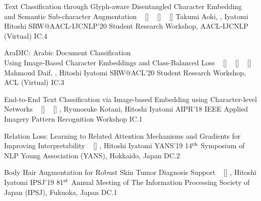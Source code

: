 \begin{publications}
    \publication
        {Text Classification through Glyph-aware Disentangled Character Embedding \\ and Semantic Sub-character Augmentation}
        {
            ~ [\href{https://aclanthology.org/2020.aacl-srw.1/}{\small{\linkSymbol}}]
            ~ [\href{https://arxiv.org/abs/2011.04184}{\small{\arxivSymbol}}]
            ~ [\href{https://github.com/IyatomiLab/GDCE-SSA}{\small{\githubSymbol}}]
        }
        {Takumi Aoki, \underline{}, Iyatomi Hitoshi}
        {SRW@AACL-IJCNLP'20} {Student Research Workshop, AACL-IJCNLP (Virtual)} {IC.4}

    \publication
        {AraDIC: Arabic Document Classification \\ Using Image-Based Character Embeddings and Class-Balanced Loss}
        {
            ~ [\href{https://aclanthology.org/2020.acl-srw.29/}{\small{\linkSymbol}}]
            ~ [\href{https://arxiv.org/abs/2006.11586}{\small{\arxivSymbol}}]
            ~ [\href{https://github.com/IyatomiLab/GDCE-SSA}{\small{\githubSymbol}}]
        }
        {Mahmoud Daif, \underline{}, Hitoshi Iyatomi}
        {SRW@ACL'20} {Student Research Workshop, ACL (Virtual)} {IC.3}
        
    \publication
        {End-to-End Text Classification via Image-based Embedding using Character-level Networks}
        {
            ~ [\href{https://ieeexplore.ieee.org/document/8707407}{\small{\linkSymbol}}]
            ~ [\href{https://arxiv.org/abs/1810.03595}{\small{\arxivSymbol}}]
        }
        {\underline{}, Ryunosuke Kotani, Hitoshi Iyatomi}
        {AIPR'18} {IEEE Applied Imagery Pattern Recognition Workshop} {IC.1}


    \publication
        {Relation Loss: Learning to Related Attention Mechanisms and Gradients for Improving Interpretability}
        {
            ~ [\href{https://www.hosei.ac.jp/gs/NEWS/zaigaku/koganei/20190920/}{\small{\linkSymbol}}]
        }
        {\underline{}, Hitoshi Iyatomi}
        {YANS'19} {14$^{\textrm{\scriptsize th}}$ Symposium of NLP Young Association (YANS), Hokkaido, Japan} {DC.2}

    \publication
        {Body Hair Augmentation for Robust Skin Tumor Diagnosis Support}
        {
            ~ [\href{https://www.hosei.ac.jp/gs/NEWS/topics/jusho/190411_4/}{\small{\linkSymbol}}]
        }
        {\underline{}, Hitoshi Iyatomi}
        {IPSJ'19} {81$^{\textrm{\scriptsize st}}$ Annual Meeting of The Information Processing Society of Japan (IPSJ), Fukuoka, Japan} {DC.1}

\end{publications}

